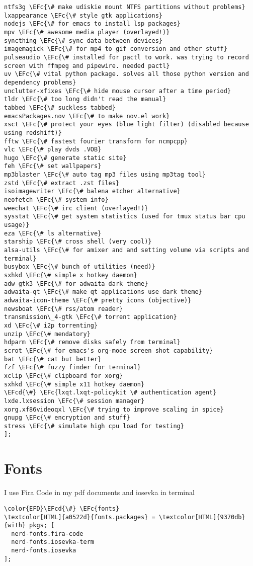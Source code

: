\documentclass[14pt]{article}
\newcommand{\EFc}[1]{\textcolor{EFc}{#1}} %
\newcommand{\EFcd}[1]{\textcolor{EFcd}{#1}} %
\begin{document}
\begin{Code}
\begin{Verbatim}
ntfs3g \EFc{\# make udiskie mount NTFS partitions without problems}
lxappearance \EFc{\# style gtk applications}
nodejs \EFc{\# for emacs to install lsp packages}
mpv \EFc{\# awesome media player (overlayed!)}
syncthing \EFc{\# sync data between devices}
imagemagick \EFc{\# for mp4 to gif conversion and other stuff}
pulseaudio \EFc{\# installed for pactl to work. was trying to record screen with ffmpeg and pipewire. needed pactl}
uv \EFc{\# vital python package. solves all those python version and dependency problems}
unclutter-xfixes \EFc{\# hide mouse cursor after a time period}
tldr \EFc{\# too long didn't read the manual}
tabbed \EFc{\# suckless tabbed}
emacsPackages.nov \EFc{\# to make nov.el work}
xsct \EFc{\# protect your eyes (blue light filter) (disabled because using redshift)}
fftw \EFc{\# fastest fourier transform for ncmpcpp}
vlc \EFc{\# play dvds .VOB}
hugo \EFc{\# generate static site}
feh \EFc{\# set wallpapers}
mp3blaster \EFc{\# auto tag mp3 files using mp3tag tool}
zstd \EFc{\# extract .zst files}
isoimagewriter \EFc{\# balena etcher alternative}
neofetch \EFc{\# system info}
weechat \EFc{\# irc client (overlayed!)}
sysstat \EFc{\# get system statistics (used for tmux status bar cpu usage)}
eza \EFc{\# ls alternative}
starship \EFc{\# cross shell (very cool)}
alsa-utils \EFc{\# for amixer and and setting volume via scripts and terminal}
busybox \EFc{\# bunch of utilities (need)}
sxhkd \EFc{\# simple x hotkey daemon}
adw-gtk3 \EFc{\# for adwaita-dark theme}
adwaita-qt \EFc{\# make qt applications use dark theme}
adwaita-icon-theme \EFc{\# pretty icons (objective)}
newsboat \EFc{\# rss/atom reader}
transmission\_4-gtk \EFc{\# torrent application}
xd \EFc{\# i2p torrenting}
unzip \EFc{\# mendatory}
hdparm \EFc{\# remove disks safely from terminal}
scrot \EFc{\# for emacs's org-mode screen shot capability}
bat \EFc{\# cat but better}
fzf \EFc{\# fuzzy finder for terminal}
xclip \EFc{\# clipboard for xorg}
sxhkd \EFc{\# simple x11 hotkey daemon}
\EFcd{\#} \EFc{lxqt.lxqt-policykit \# authentication agent}
lxde.lxsession \EFc{\# session manager}
xorg.xf86videoqxl \EFc{\# trying to improve scaling in spice}
gnupg \EFc{\# encryption and stuff}
stress \EFc{\# simulate high cpu load for testing}
];
\end{Verbatim}
\end{Code}
\section{Fonts}
\label{sec:org4cf0d45}
I use Fira Code in my pdf documents and iosevka in terminal
\begin{Code}
\begin{Verbatim}
\color{EFD}\EFcd{\#} \EFc{fonts}
\textcolor[HTML]{a0522d}{fonts.packages} = \textcolor[HTML]{9370db}{with} pkgs; [
  nerd-fonts.fira-code
  nerd-fonts.iosevka-term
  nerd-fonts.iosevka
];
\end{Verbatim}
\end{Code}
\end{document}

